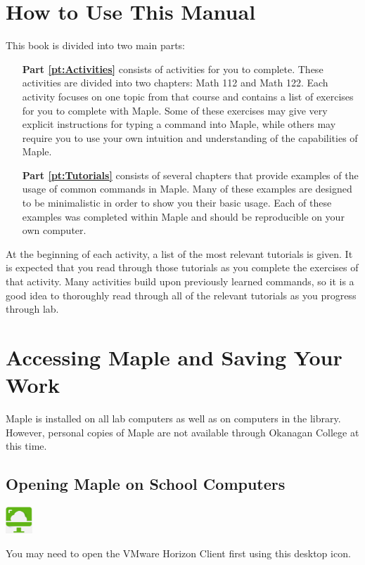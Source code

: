 \section*{How to Use This Manual}
This book is divided into two main parts:
\begin{itemize}
\item[\textbf{Part \ref{pt:Activities}}] consists of activities for you to complete. These activities are divided into two chapters: Math 112 and Math 122. Each activity focuses on one topic from that course and contains a list of exercises for you to complete with Maple. Some of these exercises may give very explicit instructions for typing a command into Maple, while others may require you to use your own intuition and understanding of the capabilities of Maple.
\item[\textbf{Part \ref{pt:Tutorials}}] consists of several chapters that provide examples of the usage of common commands in Maple. Many of these examples are designed to be minimalistic in order to show you their basic usage. Each of these examples was completed within Maple and should be reproducible on your own computer.
\end{itemize}
At the beginning of each activity, a list of the most relevant tutorials is given. It is expected that you read through those tutorials as you complete the exercises of that activity. Many activities build upon previously learned commands, so it is a good idea to thoroughly read through all of the relevant tutorials as you progress through lab.

\section*{Accessing Maple and Saving Your Work}
Maple is installed on all lab computers as well as on computers in the library. However, personal copies of Maple are not available through Okanagan College at this time.

\subsection*{Opening Maple on School Computers}

\begin{marginfigure}
\centering
\includegraphics[width=1cm]{introduction/figures/horizonvmware.png}
\caption{You may need to open the VMware Horizon Client first using this desktop icon.}
\end{marginfigure}

